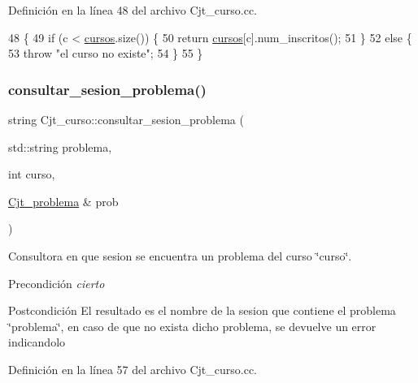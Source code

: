 Definición en la línea 48 del archivo Cjt\+\_\+curso.\+cc.


\begin{DoxyCode}
48                                   \{
49   \textcolor{keywordflow}{if} (c < \mbox{\hyperlink{class_cjt__curso_af8d4def315cf56b9aab3328bf80bb32c}{cursos}}.size()) \{
50      \textcolor{keywordflow}{return} \mbox{\hyperlink{class_cjt__curso_af8d4def315cf56b9aab3328bf80bb32c}{cursos}}[c].num\_inscritos();
51   \}
52   \textcolor{keywordflow}{else} \{
53     \textcolor{keywordflow}{throw} \textcolor{stringliteral}{"el curso no existe"};
54   \}
55 \}
\end{DoxyCode}
\mbox{\label{class_cjt__curso_a6d9976b271bd773bdff14e79991231e4}} 
\subsubsection{\texorpdfstring{consultar\+\_\+sesion\+\_\+problema()}{consultar\_sesion\_problema()}}
{\footnotesize\ttfamily string Cjt\+\_\+curso\+::consultar\+\_\+sesion\+\_\+problema (\begin{DoxyParamCaption}\item[{std\+::string}]{problema,  }\item[{int}]{curso,  }\item[{\mbox{\hyperlink{class_cjt__problema}{Cjt\+\_\+problema}} \&}]{prob }\end{DoxyParamCaption})}



Consultora en que sesion se encuentra un problema del curso \char`\"{}curso\char`\"{}. 

\begin{DoxyPrecond}{Precondición}
{\itshape cierto} 
\end{DoxyPrecond}
\begin{DoxyPostcond}{Postcondición}
El resultado es el nombre de la sesion que contiene el problema \char`\"{}problema\char`\"{}, en caso de que no exista dicho problema, se devuelve un error indicandolo 
\end{DoxyPostcond}


Definición en la línea 57 del archivo Cjt\+\_\+curso.\+cc.


